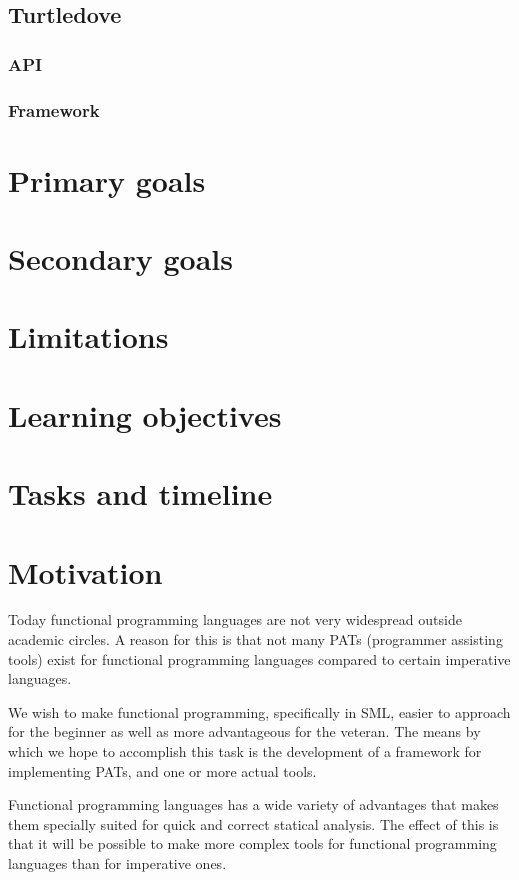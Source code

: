 \documentclass[a4paper,oneside]{article}
\begin{document}
\subsection{Turtledove}

\subsubsection{API}

\subsubsection{Framework}

\section{Primary goals}

\section{Secondary goals}

\section{Limitations}

\section{Learning objectives}

\section{Tasks and timeline}

\section{Motivation}
Today functional programming languages are not very widespread outside academic circles. A reason
for this is that not many PATs (programmer assisting tools) exist for functional programming languages
compared to certain imperative languages.

We wish to make functional programming, specifically in SML, easier to approach for the beginner as
well as more advantageous for the veteran. The means by which we hope to accomplish this task is the
development of a framework for implementing PATs, and one or more actual
tools.

Functional programming languages has a wide variety of advantages that makes them specially suited
for quick and correct statical analysis. The effect of this is that it will be possible to make more
complex tools for functional programming languages than for imperative ones.
\\
\end{document}
